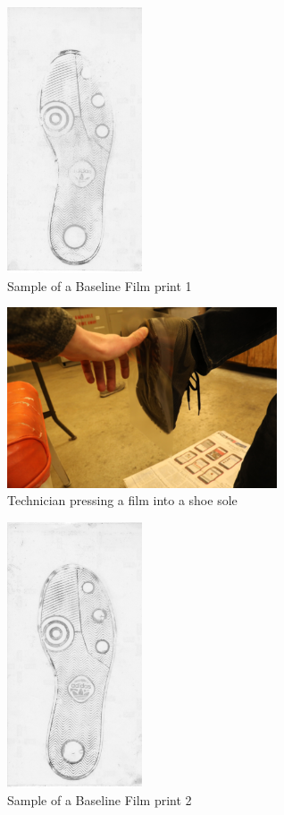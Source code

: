 \begin{figure}[!htp]
\centering
\includegraphics[width=4cm]{Film_1_Baseline}
\caption{Sample of a Baseline Film print 1}
\label{Image 14}
\end{figure}

\begin{figure}[!htp]
\centering
\includegraphics[width=8cm]{Press}
\caption{Technician pressing a film into a shoe sole}
\label{Image 15}
\end{figure}

\begin{figure}[!htp]
\centering
\includegraphics[width=4cm]{Film_2_Baseline}
\caption{Sample of a Baseline Film print 2}
\label{Image 16}
\end{figure}

